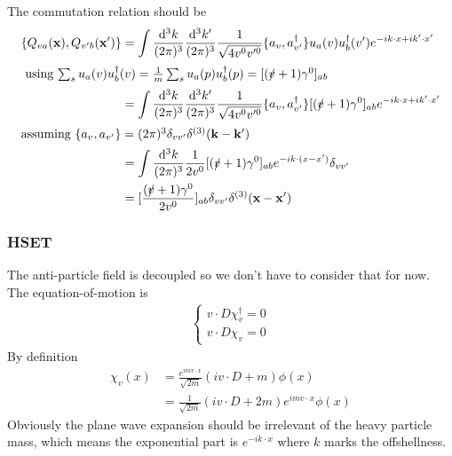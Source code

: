 \documentclass{article}
\newcommand{\g}{\gamma}
\begin{document}
The commutation relation should be
\begin{align*}
  \{Q_{va}(\vb{x}),Q_{v'b}(\vb{x'})\}&=\int \frac{\dd^3k}{(2\pi)^3}\frac{\dd^3k'}{(2\pi)^3}\frac{1}{\sqrt{4v^0v'^0}}\{a_v,a_{v'}^{\dagger}\}u_a(v)u_b^{\dagger}(v')e^{-ik\cdot x+ik'\cdot x'}\\
  \intertext{
  using $\sum_s u_a(v)u_b^{\dagger}(v)=\frac{1}{m}\sum_s u_a(p)u^{\dagger}_b(p)=[(\slashed v+1)\g^0]_{ab}$}
  &=\int \frac{\dd^3k}{(2\pi)^3}\frac{\dd^3k'}{(2\pi)^3}\frac{1}{\sqrt{4v^0v'^0}}\{a_v,a_{v'}^{\dagger}\}[(\slashed v+1)\g^0]_{ab}e^{-ik\cdot x+ik'\cdot x'}\\
  \intertext{assuming $\{a_v,a_{v'}\}=(2\pi)^3\delta_{vv'}\delta^{(3)}(\vb{k-k'})$}
  &=\int \frac{\dd^3k}{(2\pi)^3}\frac{1}{2v^0}[(\slashed v+1)\g^0]_{ab}e^{-ik\cdot (x-x')}\delta_{vv'}\\
  &=[\frac{(\slashed v+1)\g^0}{2v^0}]_{ab}\delta_{vv'}\delta^{(3)}(\vb{x-x'})
\end{align*}
\subsubsection{HSET}
The anti-particle field is decoupled so we don't have to consider that for now. The equation-of-motion is
\begin{align*}
  \begin{cases}
	v\cdot D\chi_v^{\dagger}=0\\
	v\cdot D\chi_v=0
  \end{cases}
\end{align*}
By definition
\begin{align*}
  \chi_v(x)&=\frac{e^{imv\cdot x}}{\sqrt{2m}}(iv\cdot D+m)\phi(x)\\
  &=\frac{1}{\sqrt{2m}}(iv\cdot D+2m)e^{imv\cdot x}\phi(x)
\end{align*}
Obviously the plane wave expansion should be irrelevant of the heavy particle mass, which means the exponential part is $e^{-ik\cdot x}$ where $k$ marks the offshellness.
\end{document}
